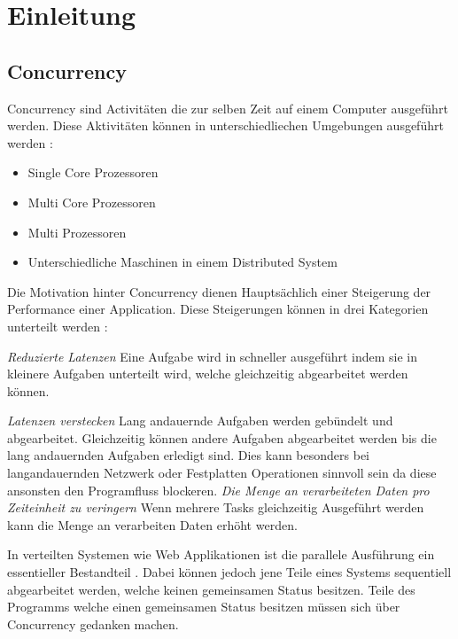 \section{Einleitung}
\label{section:Einleitung}

\subsection{Concurrency}
\label{section:concurrency}


Concurrency sind Activitäten die zur selben Zeit auf einem Computer ausgeführt werden. Diese Aktivitäten können in unterschiedliechen Umgebungen ausgeführt werden \cite[p. 14]{Erb2012}:

\begin{itemize}
  \item Single Core Prozessoren
  \item Multi Core Prozessoren
  \item Multi Prozessoren
  \item Unterschiedliche Maschinen in einem Distributed System
\end{itemize}

Die Motivation hinter Concurrency dienen Hauptsächlich einer Steigerung der Performance einer Application. Diese Steigerungen können in drei Kategorien unterteilt werden \cite[p. 18]{Can08}: 

\emph{Reduzierte Latenzen}
	Eine Aufgabe wird in schneller ausgeführt indem sie in kleinere Aufgaben unterteilt wird, welche gleichzeitig abgearbeitet werden können. \cite[p. 18]{Can08}
    
\emph{Latenzen verstecken}
	Lang andauernde Aufgaben werden gebündelt und abgearbeitet. Gleichzeitig können andere Aufgaben abgearbeitet werden bis die lang andauernden Aufgaben erledigt sind. Dies kann besonders bei langandauernden Netzwerk oder Festplatten Operationen sinnvoll sein da diese ansonsten den Programfluss blockeren.
\emph{Die Menge an verarbeiteten Daten pro Zeiteinheit zu veringern}
	Wenn mehrere Tasks gleichzeitig Ausgeführt werden kann die Menge an verarbeiten Daten erhöht werden.	

In verteilten Systemen wie Web Applikationen ist die parallele Ausführung ein essentieller Bestandteil \cite[p. 14]{Erb2012}. Dabei können jedoch jene Teile eines Systems sequentiell abgearbeitet werden, welche keinen gemeinsamen Status besitzen. Teile des Programms welche einen gemeinsamen Status besitzen müssen sich über Concurrency gedanken machen. \cite[p. 18]{Can08}


